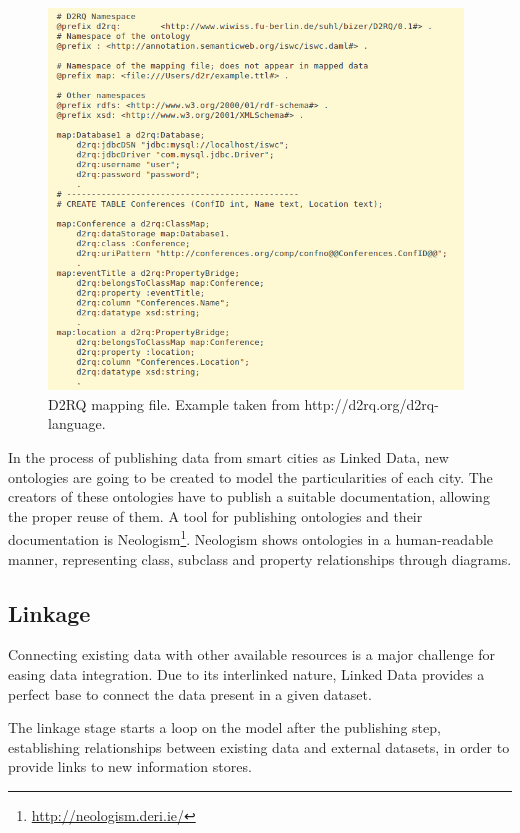 \begin{figure}
    \center
    \includegraphics[width=0.98\textwidth]{img/ld_approach/d2rq.png}
    \caption{D2RQ mapping file. Example taken from http://d2rq.org/d2rq-language.}
    \label{fig:d2rq}
\end{figure}

In the process of publishing data from smart cities as Linked Data, new ontologies are going to be created to model the particularities of each city. The creators of these ontologies have to publish a suitable documentation, allowing the proper reuse of them. A tool for publishing ontologies and their documentation is Neologism\footnote{\url{http://neologism.deri.ie/}}. Neologism shows ontologies in a human-readable manner, representing class, subclass and property relationships through diagrams.

\subsection{Linkage}

Connecting existing data with other available resources is a major challenge for easing data integration. Due to its interlinked nature, Linked Data provides a perfect base to connect the data present in a given dataset.

The linkage stage starts a loop on the model after the publishing step, establishing relationships between existing data and external datasets, in order to provide links to new information stores.


